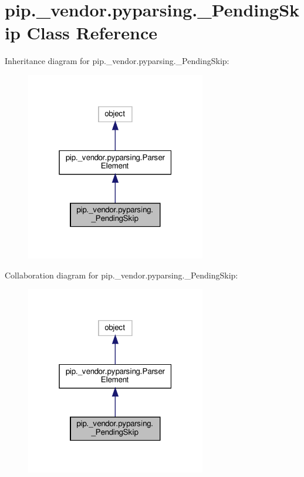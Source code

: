 \hypertarget{classpip_1_1__vendor_1_1pyparsing_1_1__PendingSkip}{}\section{pip.\+\_\+vendor.\+pyparsing.\+\_\+\+Pending\+Skip Class Reference}
\label{classpip_1_1__vendor_1_1pyparsing_1_1__PendingSkip}


Inheritance diagram for pip.\+\_\+vendor.\+pyparsing.\+\_\+\+Pending\+Skip\+:
\nopagebreak
\begin{figure}[H]
\begin{center}
\leavevmode
\includegraphics[width=223pt]{classpip_1_1__vendor_1_1pyparsing_1_1__PendingSkip__inherit__graph}
\end{center}
\end{figure}


Collaboration diagram for pip.\+\_\+vendor.\+pyparsing.\+\_\+\+Pending\+Skip\+:
\nopagebreak
\begin{figure}[H]
\begin{center}
\leavevmode
\includegraphics[width=223pt]{classpip_1_1__vendor_1_1pyparsing_1_1__PendingSkip__coll__graph}
\end{center}
\end{figure}
